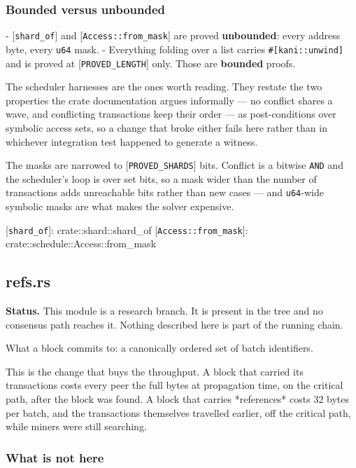 \documentclass[11pt,a4paper]{article}
\begin{document}
\subsubsection{Bounded versus unbounded}

- [\texttt{shard\_of}] and [\texttt{Access::from\_mask}] are proved \textbf{unbounded}: every
  address byte, every \texttt{u64} mask.
- Everything folding over a list carries \texttt{\#[kani::unwind]} and is proved at
  [\texttt{PROVED\_LENGTH}] only. Those are \textbf{bounded} proofs.

The scheduler harnesses are the ones worth reading. They restate the two
properties the crate documentation argues informally — no conflict shares a
wave, and conflicting transactions keep their order — as post-conditions
over symbolic access sets, so a change that broke either fails here rather
than in whichever integration test happened to generate a witness.

The masks are narrowed to [\texttt{PROVED\_SHARDS}] bits. Conflict is a bitwise
\texttt{AND} and the scheduler's loop is over set bits, so a mask wider than the
number of transactions adds unreachable bits rather than new cases — and
\texttt{u64}-wide symbolic masks are what makes the solver expensive.

[\texttt{shard\_of}]: crate::shard::shard\_of
[\texttt{Access::from\_mask}]: crate::schedule::Access::from\_mask

\subsection{refs.rs}
\begin{framed}\noindent\textbf{Status.} This module is a research branch. It is present in the tree and no consensus path reaches it. Nothing described here is part of the running chain.\end{framed}

What a block commits to: a canonically ordered set of batch identifiers.

This is the change that buys the throughput. A block that carried its
transactions costs every peer the full bytes at propagation time, on the
critical path, after the block was found. A block that carries *references*
costs 32 bytes per batch, and the transactions themselves travelled earlier,
off the critical path, while miners were still searching.

\subsubsection{What is not here}
\end{document}
